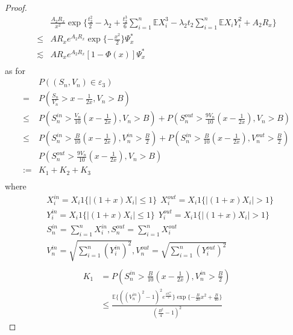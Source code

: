 \documentclass[bj,authoryear]{imsart}
\numberwithin{equation}{section}
\theoremstyle{plain}
\theoremstyle{definition}
\begin{document}
\begin{proof}
\begin{equation}
\begin{aligned}
      &\frac{A_2R_x}{x^2}\exp\{\frac{t_2^2}{2}-\lambda_2+\frac{t_2^3}{6}\sum_{i=1}^{n}\mathbb{E} X_i^3-\lambda_2t_2\sum_{i=1}^{n}\mathbb{E} X_iY_i^2+A_2R_x\}\\
      \leq & AR_xe^{A_2R_x}\exp\{-\frac{x^2}{2}\}\Psi_{x}^{*}\\
      \lesssim& AR_xe^{A_2R_x}[1-\Phi(x)]\Psi_{x}^{*}\\
    \end{aligned}
  \end{equation}
  as for 
  \begin{equation}
    \begin{aligned}
      &P((S_n,V_n)\in\varepsilon_3)\\
      =& P(\frac{S_n}{V_n}>x-\frac{1}{2x},V_n>B)\\
      \leq & P(S_n^{in}>\frac{V_n}{10}(x-\frac{1}{2x}),V_n>B)+P(S_n^{out}>\frac{9V_n}{10}(x-\frac{1}{2x}),V_n>B)\\
      \leq &P(S_n^{in}>\frac{B}{10}(x-\frac{1}{2x}),V_n^{in}>\frac{B}{2})+P(S_n^{in}>\frac{B}{10}(x-\frac{1}{2x}),V_n^{out}>\frac{B}{2})\\
      &P(S_n^{out}>\frac{9V_n}{10}(x-\frac{1}{2x}),V_n>B)\\
      :=& K_1+K_2+K_3\\
    \end{aligned}
  \end{equation}
  where 
  \begin{equation}
    \begin{aligned}
      &X_i^{in} = X_i1\{|(1+x)X_i|\leq 1\}\ \ X_i^{out} = X_i1\{|(1+x)X_i|> 1\}\\
      &Y_i^{in} = X_i1\{|(1+x)X_i|\leq 1\}\ \ Y_i^{out} = X_i1\{|(1+x)X_i|> 1\}\\
      & S_n^{in} = \sum_{i = 1}^{n}X_i^{in}, S_n^{out} = \sum_{i =1}^{n}X_i^{out}\\
      & V_n^{in} = \sqrt{\sum_{i=1}^{n}(Y_{i}^{in})^2},V_n^{out} = \sqrt{\sum_{i=1}^{n}(Y_{i}^{out})^2}\\
    \end{aligned}
  \end{equation}
  \begin{equation}
    \begin{aligned}
      K_1 & = P(S_n^{in}>\frac{B}{10}(x-\frac{1}{2x}),V_n^{in}>\frac{B}{2})\\
      &\leq \frac{\mathbb{E} \{((V_n^{in})^2-1)^2e^{\frac{xS_n^{in}}{2}}\}\exp\{-\frac{B}{20}x^2+\frac{B}{40}\}}{(\frac{B^2}{4}-1)^2}
    \end{aligned}

\end{equation}
\end{proof}
\end{document}

